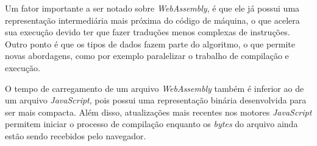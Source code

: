 Um fator importante a ser notado sobre \textit{WebAssembly}, é que ele já possui uma
representação intermediária mais próxima do código de máquina, o que acelera sua execução
devido ter que fazer traduções menos complexas de instruções. Outro ponto é que os tipos
de dados fazem parte do algoritmo, o que permite novas abordagens, como por exemplo
paralelizar o trabalho de compilação e execução.

O tempo de carregamento de um arquivo \textit{WebAssembly} também é inferior ao de um
arquivo \textit{JavaScript}, pois possui uma representação binária desenvolvida para ser
mais compacta. Além disso, atualizações mais recentes nos motores \textit{JavaScript}
permitem iniciar o processo de compilação enquanto os \textit{bytes} do arquivo ainda
estão sendo recebidos pelo navegador.